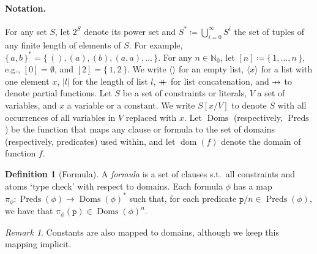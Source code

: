 \documentclass{article}
\theoremstyle{definition}
\newtheorem{definition}{Definition}
\theoremstyle{remark}
\newtheorem*{remark}{Remark}
\newcommand\pfun{\mathrel{\ooalign{\hfil$\mapstochar\mkern5mu$\hfil\cr$\to$\cr}}}
\newcommand\mdoubleplus{\mathbin{+\mkern-10mu+}}
\DeclareMathOperator{\dom}{dom}
\DeclareMathOperator{\Doms}{Doms}
\DeclareMathOperator{\Preds}{Preds}
\begin{document}
\paragraph{Notation.}
For any set $S$, let $2^{S}$ denote its power set and
$S^{\ast} \coloneqq \bigcup_{i=0}^{\infty} S^{i}$ the set of tuples of any
finite length of elements of $S$. For example,
$\{\,a, b\,\}^{\ast} = \{\, (), (a), (b), (a, a), \dots \,\}$. For any
$n \in \mathbb{N}_{0}$, let $[n] \coloneqq \{\, 1, \dots, n \,\}$, e.g.,
$[0] = \emptyset$, and $[2] = \{\, 1, 2 \,\}$. We write $\langle\rangle$ for an
empty list, $\langle x \rangle$ for a list with one element $x$, $|l|$ for the
length of list $l$, $\mdoubleplus$ for list concatenation, and $\pfun$ to denote
partial functions. Let $S$ be a set of constraints or literals, $V$ a set of
variables, and $x$ a variable or a constant. We write $S[x/V]$ to denote $S$
with all occurrences of all variables in $V$ replaced with $x$. Let $\Doms$
(respectively, $\Preds$) be the function that maps any clause or formula to the
set of domains (respectively, predicates) used within, and let $\dom(f)$ denote
the domain of function $f$.

\begin{definition}[Formula]\label{def:formula}
  A \emph{formula} is a set of clauses s.t.\ all constraints and atoms `type
  check' with respect to domains. Each formula $\phi$ has a map
  $\pi_{\phi}\colon \Preds(\phi) \to {\Doms(\phi)}^{\ast}$ such that, for each
  predicate $\texttt{p}/n \in \Preds(\phi)$, we have that
  $\pi_{\phi}(\texttt{p}) \in {\Doms(\phi)}^{n}$.
\end{definition}

\begin{remark}
  Constants are also mapped to domains, although we keep this mapping implicit.
\end{remark}
\end{document}
